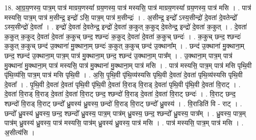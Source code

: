 \documentclass[17pt]{extarticle}
\begin{document}
18. आ॒ग्र॒य॒णस्य॒ पात्र॒म् पात्र॑ माग्रय॒णस्या᳚ ग्रय॒णस्य॒ पात्र॑ मस्यसि॒ पात्र॑ माग्रय॒णस्या᳚ ग्रय॒णस्य॒ पात्र॑ मसि । . पात्र॑ मस्यसि॒ पात्र॒म् पात्र॑ म॒सीन्द्र॒ इन्द्रो॑ ऽसि॒ पात्र॒म् पात्र॑ म॒सीन्द्रः॑ । . अ॒सीन्द्र॒ इन्द्रो᳚ ऽस्य॒सीन्द्रो॑ दे॒वता॑ दे॒वतेन्द्रो᳚ ऽस्य॒सीन्द्रो॑ दे॒वता᳚ । . इन्द्रो॑ दे॒वता॑ दे॒वतेन्द्र॒ इन्द्रो॑ दे॒वता॑ क॒कुत् क॒कुद् दे॒वतेन्द्र॒ इन्द्रो॑ दे॒वता॑ क॒कुत् । . दे॒वता॑ क॒कुत् क॒कुद् दे॒वता॑ दे॒वता॑ क॒कुच् छन्द॒ श्छन्दः॑ क॒कुद् दे॒वता॑ दे॒वता॑ क॒कुच् छन्दः॑ । . क॒कुच् छन्द॒ श्छन्दः॑ क॒कुत् क॒कुच् छन्द॑ उ॒क्थाना॑ मु॒क्थाना॒म् छन्दः॑ क॒कुत् क॒कुच् छन्द॑ उ॒क्थाना᳚म् । . छन्द॑ उ॒क्थाना॑ मु॒क्थाना॒म् छन्द॒ श्छन्द॑ उ॒क्थाना॒म् पात्र॒म् पात्र॑ मु॒क्थाना॒म् छन्द॒ श्छन्द॑ उ॒क्थाना॒म् पात्र᳚म् । . उ॒क्थाना॒म् पात्र॒म् पात्र॑ मु॒क्थाना॑ मु॒क्थाना॒म् पात्र॑ मस्यसि॒ पात्र॑ मु॒क्थाना॑ मु॒क्थाना॒म् पात्र॑ मसि । . पात्र॑ मस्यसि॒ पात्र॒म् पात्र॑ मसि पृथि॒वी पृ॑थि॒व्य॑सि॒ पात्र॒म् पात्र॑ मसि पृथि॒वी । . अ॒सि॒ पृ॒थि॒वी पृ॑थि॒व्य॑स्यसि पृथि॒वी दे॒वता॑ दे॒वता॑ पृथि॒व्य॑स्यसि पृथि॒वी दे॒वता᳚ । . पृ॒थि॒वी दे॒वता॑ दे॒वता॑ पृथि॒वी पृ॑थि॒वी दे॒वता॑ वि॒राड् वि॒राड् दे॒वता॑ पृथि॒वी पृ॑थि॒वी दे॒वता॑ वि॒राट् । . दे॒वता॑ वि॒राड् वि॒राड् दे॒वता॑ दे॒वता॑ वि॒राट् छन्द॒ श्छन्दो॑ वि॒राड् दे॒वता॑ दे॒वता॑ वि॒राट् छन्दः॑ । . वि॒राट् छन्द॒ श्छन्दो॑ वि॒राड् वि॒राट् छन्दो᳚ ध्रु॒वस्य॑ ध्रु॒वस्य॒ छन्दो॑ वि॒राड् वि॒राट् छन्दो᳚ ध्रु॒वस्य॑ । . वि॒राडिति॑ वि - राट् । . छन्दो᳚ ध्रु॒वस्य॑ ध्रु॒वस्य॒ छन्द॒ श्छन्दो᳚ ध्रु॒वस्य॒ पात्र॒म् पात्र॑म् ध्रु॒वस्य॒ छन्द॒ श्छन्दो᳚ ध्रु॒वस्य॒ पात्र᳚म् । . ध्रु॒वस्य॒ पात्र॒म् पात्र॑म् ध्रु॒वस्य॑ ध्रु॒वस्य॒ पात्र॑ मस्यसि॒ पात्र॑म् ध्रु॒वस्य॑ ध्रु॒वस्य॒ पात्र॑ मसि । . पात्र॑ मस्यसि॒ पात्र॒म् पात्र॑ मसि । . अ॒सीत्य॑सि । \newline
\pagebreak
{}
\end{document}
